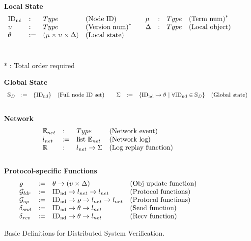 \begin{figure}
\begin{small}
\raggedright

\textbf{Local State}\\
$$
\begin{array}{lllllllll}
\mathrm{ID_{nd}} &:& Type & \mbox{(Node ID)} & & \mu &:& Type & \mbox{(Term num)}^* \\
\upsilon &:& Type & \mbox{(Version num)}^* & &\Delta &:& Type & \mbox{(Local object)}\\
\theta &:=& (\mu  \times \upsilon \times \Delta) & \mbox{(Local state)} & & & & & \\
\end{array}
$$
\\
\raggedleft

* : Total order required

\raggedright
\textbf{Global State}\\
$$
\begin{array}{lllllllll}
\fullset &:=& \set{\nodeid} & \mbox{(Full node ID set)} & & \gstate &:=& \set{ \nodeid \mapsto \dstate ~\vert~ \forall \nodeid \in \fullset} & \mbox{(Global state)}\\
\end{array}
$$
\\
\textbf{Network} \\
$$
\begin{array}{llll}
\packet &: & Type & \mbox{(Network event)}\\
\networklog &:=& \mbox{list}\ \packet & \mbox{(Network log)}\\
\replay &:& \networklog \rightarrow  \gstate& \mbox{(Log replay function)}\\
\end{array}
$$
\\
\textbf{Protocol-specific Functions}  \\
$$
\begin{array}{llll}
	\updatefunc & := & \dstate \rightarrow (\seqnum \times \dsvalue) &
	\mbox{(Obj update function)} \\
\gldrfunction & := & \nodeid \rightarrow \networklog \rightarrow \networklog  & \mbox{(Protocol functions)} \\
\gopfunction & := & \nodeid \rightarrow \updatefunc \rightarrow \networklog \rightarrow \networklog  & \mbox{(Protocol functions)} \\

\sendfunction & := & \nodeid \rightarrow \dstate \rightarrow \networklog & \mbox{(Send function)}\\
\recvfunction & := & \nodeid \rightarrow \dstate \rightarrow \networklog & \mbox{(Recv function)}\\
\end{array}
$$
\end{small}
\caption{Basic Definitions for Distributed System Verification.}
\label{fig:chapter:witnesspassing:basic-state}
\end{figure}

